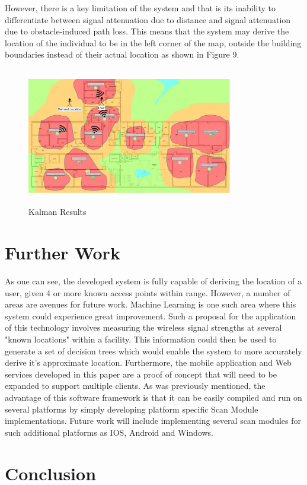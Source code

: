 \documentclass[conference]{IEEEtran}
\begin{document}
However, there is a key limitation of the system and that is its inability to differentiate between signal attenuation due to distance and signal attenuation due to obstacle-induced path loss. This means that the system may derive the location of the individual to be in the left corner of the map, outside the building boundaries instead of their actual location as shown in Figure 9.
\begin{figure}[H]
    \includegraphics[width=9.0cm,height=6cm]{Geolocation_3.jpeg}
    \caption{Kalman Results}
    \end{figure}

\section{Further Work}
As one can see, the developed system is fully capable of deriving the location of a user, given 4 or more known access points within range. However, a number of areas are avenues for future work. Machine Learning is one such area where this system could experience great improvement. Such a proposal for the application of this technology involves measuring the wireless signal strengths at several "known locations" within a facility. This information could then be used to generate a set of decision trees which would enable the system to more accurately derive it's approximate location. Furthermore, the mobile application and Web services developed in this paper are a proof of concept that will need to be expanded to support multiple clients. As was previously mentioned, the advantage of this software framework is that it can be easily compiled and run on several platforms by simply developing platform specific Scan Module implementations. Future work will include implementing several scan modules for such additional platforms as IOS, Android and Windows.

\section{Conclusion}
\end{document}
